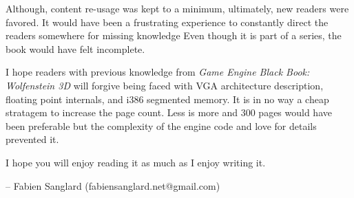 \par
Although, content re-usage was kept to a minimum, ultimately, new readers were favored. It would have been a frustrating experience to constantly direct the readers somewhere for missing knowledge Even though it is part of a series, the book would have felt incomplete.\\
\par
I hope readers with previous knowledge from \textit{Game Engine Black Book: Wolfenstein 3D} will forgive being faced with VGA architecture description, floating point internals, and i386 segmented memory. It is in no way a cheap stratagem to increase the page count. Less is more and 300 pages would have been preferable but the complexity of the engine code and love for details prevented it.\\
\par
I hope you will enjoy reading it as much as I enjoy writing it.\\
\par
-- Fabien Sanglard (fabiensanglard.net@gmail.com)